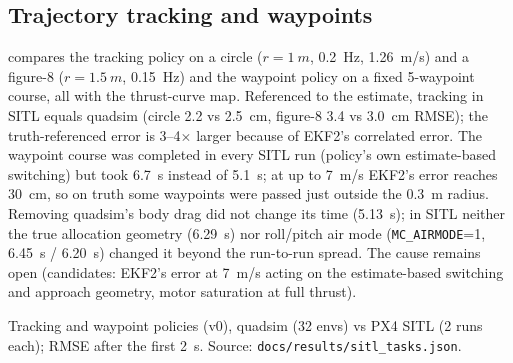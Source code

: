\subsection{Trajectory tracking and waypoints}
 compares the tracking policy on a circle ($r=\SI{1}{m}$, \SI{0.2}{Hz}, \SI{1.26}{m/s}) and a figure-8
($r=\SI{1.5}{m}$, \SI{0.15}{Hz}) and the waypoint policy on a fixed 5-waypoint course, all with the thrust-curve map.
Referenced to the estimate, tracking in SITL equals quadsim (circle 2.2 vs \SI{2.5}{cm}, figure-8 3.4 vs \SI{3.0}{cm} RMSE);
the truth-referenced error is 3--4$\times$ larger because of EKF2's correlated error. The waypoint course was completed
in every SITL run (policy's own estimate-based switching) but took \SI{6.7}{s} instead of \SI{5.1}{s}; at up to
\SI{7}{m/s} EKF2's error reaches \SI{30}{cm}, so on truth some waypoints were passed just outside the \SI{0.3}{m} radius.
Removing quadsim's body drag did not change its time (\SI{5.13}{s}); in SITL neither the true allocation geometry
(\SI{6.29}{s}) nor roll/pitch air mode (\texttt{MC\_AIRMODE}=1, \SI{6.45}{s} / \SI{6.20}{s}) changed it beyond the
run-to-run spread. The cause remains open (candidates: EKF2's error at \SI{7}{m/s} acting on the estimate-based
switching and approach geometry, motor saturation at full thrust).
\begin{table}[!htbp]\centering\small
\begin{adjustbox}{max width=\linewidth}\end{adjustbox}
\caption{Tracking and waypoint policies (v0), quadsim (32 envs) vs PX4 SITL (2 runs each); RMSE after the first
\SI{2}{s}. Source: \texttt{docs/results/sitl\_tasks.json}.}
\label{tab:sitl-tasks}
\end{table}


